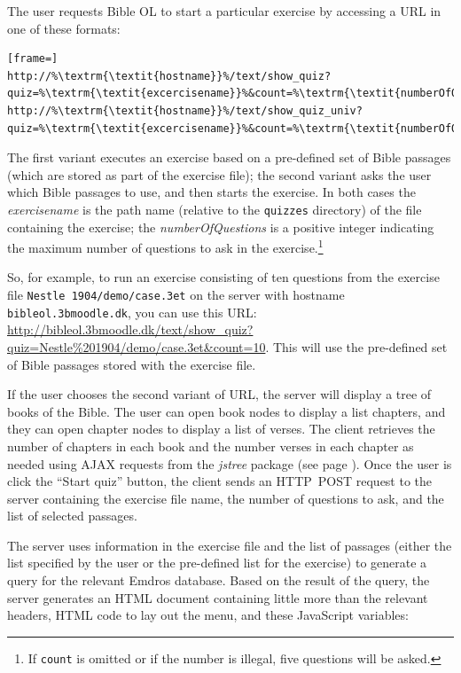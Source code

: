 \documentclass[11pt,oneside,a4paper]{memoir}
\begin{document}
The user requests Bible OL to start a particular exercise by accessing a URL in one of these
formats:

\begin{lstlisting}[frame=]
http://%\textrm{\textit{hostname}}%/text/show_quiz?quiz=%\textrm{\textit{excercisename}}%&count=%\textrm{\textit{numberOfQuestions}}%
http://%\textrm{\textit{hostname}}%/text/show_quiz_univ?quiz=%\textrm{\textit{excercisename}}%&count=%\textrm{\textit{numberOfQuestions}}%
\end{lstlisting}

The first variant executes an exercise based on a pre-defined set of Bible passages (which are stored as
part of the exercise file); the second variant asks the user which Bible passages to use, and then
starts the exercise. In both cases the \emph{exercisename} is the path name (relative to the
\texttt{quizzes} directory) of the file containing the exercise; the \emph{numberOfQuestions} is a
positive integer indicating the maximum number of questions to ask in the exercise.\footnote{If
  \texttt{count} is omitted or if the number is illegal, five questions will be asked.}

So, for example, to run an exercise consisting of ten questions from the exercise file
\texttt{Nestle~1904/demo/case.3et} on the server with hostname \texttt{bibleol.3bmoodle.dk}, you can
use this URL:
\url{http://bibleol.3bmoodle.dk/text/show_quiz?quiz=Nestle\%201904/demo/case.3et&count=10}. This
will use the pre-defined set of Bible passages stored with the exercise file.

If the user chooses the second variant of URL, the server will display a tree of books of the Bible.
The user can open book nodes to display a list chapters, and they can open chapter nodes to display
a list of verses. The client retrieves the number of chapters in each book and the number verses in
each chapter as needed using AJAX requests from the \emph{jstree} package (see page
\pageref{jstree}). Once the user is click the ``Start quiz'' button, the client sends an HTTP~POST
request to the server containing the exercise file name, the number of questions to ask, and the
list of selected passages.

The server uses information in the exercise file and the list of passages (either the list specified
by the user or the pre-defined list for the exercise) to generate a query for the relevant Emdros
database. Based on the result of the query, the server generates an HTML document containing little
more than the relevant headers, HTML code to lay out the menu, and these JavaScript variables:
\end{document}
